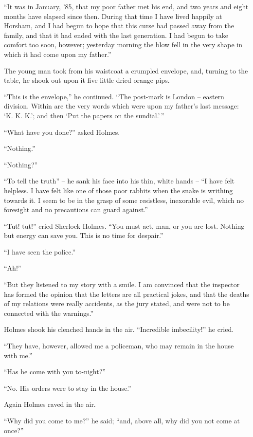 “It was in January, ’85, that my poor father met his end,
and two years and eight months have elapsed since then.
During that time I have lived happily at Horsham, and I had
begun to hope that this curse had passed away from the family,
and that it had ended with the last generation. I had begun
to take comfort too soon, however; yesterday morning the
blow fell in the very shape in which it had come upon my
father.”

The young man took from his waistcoat a crumpled envelope,
and, turning to the table, he shook out upon it five
little dried orange pips.

“This is the envelope,” he continued. “The post-mark is
London -- eastern division. Within are the very words which
were upon my father’s last message: ‘K. K. K.’; and then
‘Put the papers on the sundial.’\,”

“What have you done?” asked Holmes.

“Nothing.”

“Nothing?”

“To tell the truth” -- he sank his face into his thin, white
hands -- “I have felt helpless. I have felt like one of those
poor rabbits when the snake is writhing towards it. I seem
to be in the grasp of some resistless, inexorable evil, which
no foresight and no precautions can guard against.”

“Tut! tut!” cried Sherlock Holmes. “You must act, man,
or you are lost. Nothing but energy can save you. This is
no time for despair.”

“I have seen the police.”

“Ah!”

“But they listened to my story with a smile. I am convinced
that the inspector has formed the opinion that the
letters are all practical jokes, and that the deaths of my relations
were really accidents, as the jury stated, and were not
to be connected with the warnings.”

Holmes shook his clenched hands in the air. “Incredible
imbecility!” he cried.

“They have, however, allowed me a policeman, who may
remain in the house with me.”

“Has he come with you to-night?”

“No. His orders were to stay in the house.”

Again Holmes raved in the air.

“Why did you come to me?” he said; “and, above all,
why did you not come at once?”

